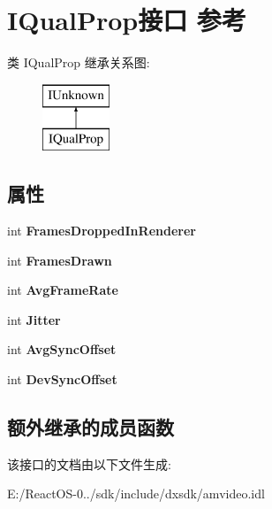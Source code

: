 \hypertarget{interface_i_qual_prop}{}\section{I\+Qual\+Prop接口 参考}
\label{interface_i_qual_prop}
类 I\+Qual\+Prop 继承关系图\+:\begin{figure}[H]
\begin{center}
\leavevmode
\includegraphics[height=2.000000cm]{interface_i_qual_prop}
\end{center}
\end{figure}
\subsection*{属性}
\begin{DoxyCompactItemize}
\item 
\mbox{\label{interface_i_qual_prop_a382d606782e3851d5cd575351ccf7986}} 
int {\bfseries Frames\+Dropped\+In\+Renderer}
\item 
\mbox{\label{interface_i_qual_prop_a4e72358d7693e05fb3b2acd7d5b73af6}} 
int {\bfseries Frames\+Drawn}
\item 
\mbox{\label{interface_i_qual_prop_a758b8736ac054c76e5f2dd3748c5264f}} 
int {\bfseries Avg\+Frame\+Rate}
\item 
\mbox{\label{interface_i_qual_prop_a3a478138427d360f345bfb0795060c10}} 
int {\bfseries Jitter}
\item 
\mbox{\label{interface_i_qual_prop_a35df55b31b94192e71a53499c2c4d881}} 
int {\bfseries Avg\+Sync\+Offset}
\item 
\mbox{\label{interface_i_qual_prop_ae6a1a6d335fbc023d3299aed4f750aeb}} 
int {\bfseries Dev\+Sync\+Offset}
\end{DoxyCompactItemize}
\subsection*{额外继承的成员函数}


该接口的文档由以下文件生成\+:\begin{DoxyCompactItemize}
\item 
E\+:/\+React\+O\+S-\/0../sdk/include/dxsdk/amvideo.\+idl\end{DoxyCompactItemize}
